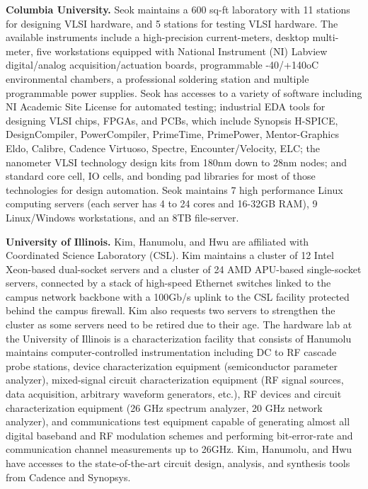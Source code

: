 \noindent
\textbf{Columbia University.} 
Seok maintains a 600 sq-ft laboratory with 11 stations for designing VLSI hardware, and 5 stations for testing VLSI hardware. 
The available instruments include a high-precision current-meters, desktop multi-meter, five workstations equipped with National Instrument (NI) Labview digital/analog acquisition/actuation boards, programmable -40/+140oC environmental chambers, a professional soldering station and multiple programmable power supplies. 
Seok has accesses to a variety of software including NI Academic Site License for automated testing; industrial EDA tools for designing VLSI chips, FPGAs, and PCBs, which include Synopsis H-SPICE, DesignCompiler, PowerCompiler, PrimeTime, PrimePower, Mentor-Graphics Eldo, Calibre, Cadence Virtuoso, Spectre, Encounter/Velocity, ELC; the nanometer VLSI technology design kits from 180nm down to 28nm nodes; and standard core cell, IO cells, and bonding pad libraries for most of those technologies for design automation. 
Seok maintains 7 high performance Linux computing servers (each server has 4 to 24 cores and 16-32GB RAM), 9 Linux/Windows workstations, and an 8TB file-server. 

\vspace{3pt}
\noindent
\textbf{University of Illinois.}
Kim, Hanumolu, and Hwu are affiliated with Coordinated Science Laboratory (CSL). 
Kim maintains a cluster of 12 Intel Xeon-based dual-socket servers and a cluster of 24 AMD APU-based single-socket servers, 
connected by a stack of high-speed Ethernet switches linked to the campus network backbone with a 100Gb/s uplink to the CSL facility protected behind the campus firewall.
Kim also requests two servers to strengthen the cluster as some servers need to be retired due to their age. 
The hardware lab at the University of Illinois is a characterization facility that consists of 
Hanumolu maintains computer-controlled instrumentation including DC to RF cascade probe stations, device characterization equipment (semiconductor parameter analyzer), 
mixed-signal circuit characterization equipment (RF signal sources, data acquisition, arbitrary waveform generators, etc.), RF devices and circuit characterization equipment (26 GHz spectrum analyzer, 20 GHz network analyzer), and communications test equipment capable of generating almost all digital baseband and RF modulation schemes and performing bit-error-rate and communication channel measurements up to 26GHz. 
Kim, Hanumolu, and Hwu have accesses to the state-of-the-art circuit design, analysis, and synthesis tools from Cadence and Synopsys.

